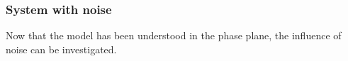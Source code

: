 \documentclass[12pt,a4paper]{article}
\begin{document}
\subsubsection{System with noise}
Now that the model has been understood in the phase plane, the influence of noise can be investigated.
\begin{figure}[H]

\end{figure}
\end{document}
